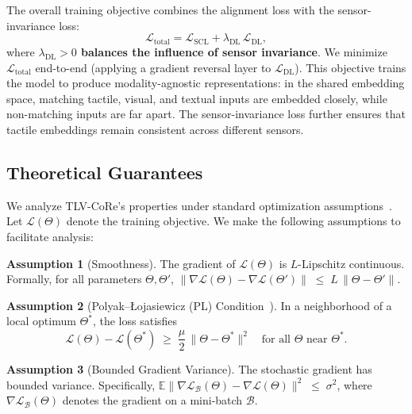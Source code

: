 \documentclass[letterpaper]{article} %
\theoremstyle{definition}                %
\newtheorem{assumption}{Assumption}[section]   %
\theoremstyle{plain}                     %
\theoremstyle{remark}                    %
\begin{document}
The overall training objective combines the alignment loss with the sensor-invariance loss:
\begin{equation}
\mathcal{L}_{\text{total}} = \mathcal{L}_{\text{SCL}} + \lambda_{\text{DL}}\,\mathcal{L}_{\text{DL}},
\end{equation}
where \textbf{$\lambda_{\text{DL}}>0$ balances the influence of sensor invariance}. We minimize $\mathcal{L}_{\text{total}}$ end-to-end (applying a gradient reversal layer to $\mathcal{L}_{\text{DL}}$). This objective trains the model to produce modality-agnostic representations: in the shared embedding space, matching tactile, visual, and textual inputs are embedded closely, while non-matching inputs are far apart. The sensor-invariance loss further ensures that tactile embeddings remain consistent across different sensors.



\subsection{Theoretical Guarantees}
\label{subsec:theory}

We analyze TLV-CoRe’s properties under standard optimization assumptions~\cite{patel2022global,xu2025psmgd,lei2019stochastic,pham2020proxsarah}. Let $\mathcal{L}(\Theta)$ denote the training objective. We make the following assumptions to facilitate analysis:

\begin{assumption}[Smoothness]
\label{assum:smoothness}
The gradient of $\mathcal{L}(\Theta)$ is $L$-Lipschitz continuous. Formally, for all parameters $\Theta, \Theta'$, $\|\nabla\mathcal{L}(\Theta) - \nabla\mathcal{L}(\Theta')\|
\;\le\; L\,\|\Theta - \Theta'\|$.

\end{assumption}

\begin{assumption}[Polyak--{\L}ojasiewicz (PL) Condition~\cite{karimi2016linear}]
\label{assum:pl}
In a neighborhood of a local optimum $\Theta^*$, the loss satisfies 
\[
\mathcal{L}(\Theta) - \mathcal{L}(\Theta^*)
\;\ge\; \frac{\mu}{2}\,\|\Theta - \Theta^*\|^2
\quad\text{for all }\Theta\text{ near }\Theta^*.
\]
\end{assumption}

\begin{assumption}[Bounded Gradient Variance]
\label{assum:bounded_variance}
The stochastic gradient has bounded variance. Specifically, $\mathbb{E}\bigl\|\nabla\mathcal{L}_{\mathcal{B}}(\Theta) - \nabla\mathcal{L}(\Theta)\bigr\|^2
\;\le\; \sigma^2$, 
where $\nabla\mathcal{L}_{\mathcal{B}}(\Theta)$ denotes the gradient on a mini-batch $\mathcal{B}$.
\end{assumption}
\end{document}
